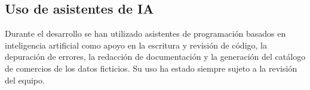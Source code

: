\subsection{Uso de asistentes de IA}

Durante el desarrollo se han utilizado asistentes de programación basados en
inteligencia artificial como apoyo en la escritura y revisión de código, la
depuración de errores, la redacción de documentación y la generación del
catálogo de comercios de los datos ficticios. Su uso ha estado siempre sujeto a la revisión del equipo.
